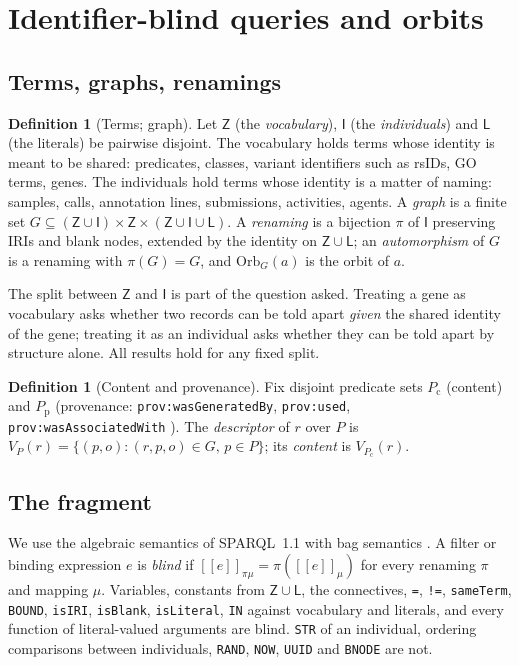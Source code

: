 \documentclass[11pt,twocolumn,a4paper]{article}
\theoremstyle{plain}
\theoremstyle{definition}
\newtheorem{definition}[theorem]{Definition}
\theoremstyle{remark}
\newcommand{\G}{G}
\newcommand{\Iset}{\mathsf{I}}
\newcommand{\Zset}{\mathsf{Z}}
\newcommand{\Lset}{\mathsf{L}}
\newcommand{\Pc}{P_{\mathrm{c}}}
\newcommand{\Pp}{P_{\mathrm{p}}}
\newcommand{\Desc}{V}
\newcommand{\orb}{\mathrm{Orb}}
\newcommand{\genby}{\texttt{prov:wasGeneratedBy}}
\newcommand{\used}{\texttt{prov:used}}
\newcommand{\assoc}{\texttt{prov:wasAssociatedWith}}
\begin{document}
\section{Identifier-blind queries and orbits}
\label{sec:generic}

\subsection{Terms, graphs, renamings}

\begin{definition}[Terms; graph]
\label{def:terms}
Let $\Zset$ (the \emph{vocabulary}), $\Iset$ (the \emph{individuals}) and
$\Lset$ (the literals) be pairwise disjoint. The vocabulary holds terms whose
identity is meant to be shared: predicates, classes, variant identifiers such
as rsIDs, GO terms, genes. The individuals hold terms whose identity is a
matter of naming: samples, calls, annotation lines, submissions, activities,
agents. A \emph{graph} is a finite set
$\G\subseteq(\Zset\cup\Iset)\times\Zset\times(\Zset\cup\Iset\cup\Lset)$. A
\emph{renaming} is a bijection $\pi$ of $\Iset$ preserving IRIs and blank
nodes, extended by the identity on $\Zset\cup\Lset$; an \emph{automorphism} of
$\G$ is a renaming with $\pi(\G)=\G$, and $\orb_\G(a)$ is the orbit of $a$.
\end{definition}

The split between $\Zset$ and $\Iset$ is part of the question asked. Treating a
gene as vocabulary asks whether two records can be told apart \emph{given} the
shared identity of the gene; treating it as an individual asks whether they
can be told apart by structure alone. All results hold for any fixed split.

\begin{definition}[Content and provenance]
\label{def:content}
Fix disjoint predicate sets $\Pc$ (content) and $\Pp$ (provenance: \genby,
\used, \assoc{} \citep{provo}). The \emph{descriptor} of $r$ over $P$ is
$\Desc_P(r)=\{(p,o):(r,p,o)\in\G,\,p\in P\}$; its \emph{content} is
$\Desc_{\Pc}(r)$.
\end{definition}

\subsection{The fragment}

We use the algebraic semantics of SPARQL~1.1 with bag semantics
\citep{sparql11,perez2009}. A filter or binding expression $e$ is \emph{blind}
if $[\![e]\!]_{\pi\mu}=\pi([\![e]\!]_\mu)$ for every renaming $\pi$ and mapping
$\mu$. Variables, constants from $\Zset\cup\Lset$, the connectives,
\texttt{=}, \texttt{!=}, \texttt{sameTerm}, \texttt{BOUND}, \texttt{isIRI},
\texttt{isBlank}, \texttt{isLiteral}, \texttt{IN} against vocabulary and
literals, and every function of literal-valued arguments are blind.
\texttt{STR} of an individual, ordering comparisons between individuals,
\texttt{RAND}, \texttt{NOW}, \texttt{UUID} and \texttt{BNODE} are not.
\end{document}
